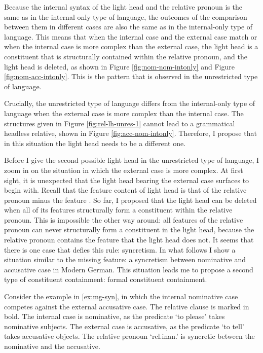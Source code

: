Because the internal syntax of the light head and the relative pronoun is the same as in the internal-only type of language, the outcomes of the comparison between them in different cases are also the same as in the internal-only type of language. This means that when the internal case and the external case match or when the internal case is more complex than the external case, the light head is a constituent that is structurally contained within the relative pronoun, and the light head is deleted, as shown in Figure \ref{fig:nom-nom-intonly} and Figure \ref{fig:nom-acc-intonly}. This is the pattern that is observed in the unrestricted type of language.

Crucially, the unrestricted type of language differs from the internal-only type of language when the external case is more complex than the internal case. The structures given in Figure \ref{fig:rel-lh-unres-1} cannot lead to a grammatical headless relative, shown in Figure \ref{fig:acc-nom-intonly}. Therefore, I propose that in this situation the light head needs to be a different one.

Before I give the second possible light head in the unrestricted type of language, I zoom in on the situation in which the external case is more complex. At first sight, it is unexpected that the light head bearing the external case surfaces to begin with. Recall that the feature content of light head is that of the relative pronoun minus the feature .
So far, I proposed that the light head can be deleted when all of its features structurally form a constituent within the relative pronoun. This is impossible the other way around: all features of the relative pronoun can never structurally form a constituent in the light head, because the relative pronoun contains the feature  that the light head does not. It seems that there is one case that defies this rule: syncretism.
In what follows I show a situation similar to the missing  feature: a syncretism between nominative and accusative case in Modern German. This situation leads me to propose a second type of constituent containment: formal constituent containment.

Consider the example in \ref{ex:mg-syn}, in which the internal nominative case competes against the external accusative case. The relative clause is marked in bold.
The internal case is nominative, as the predicate  `to please' takes nominative subjects.
The external case is accusative, as the predicate  `to tell' takes accusative objects.
The relative pronoun  `\ac{rel}.\ac{inan}.' is syncretic between the nominative and the accusative.

